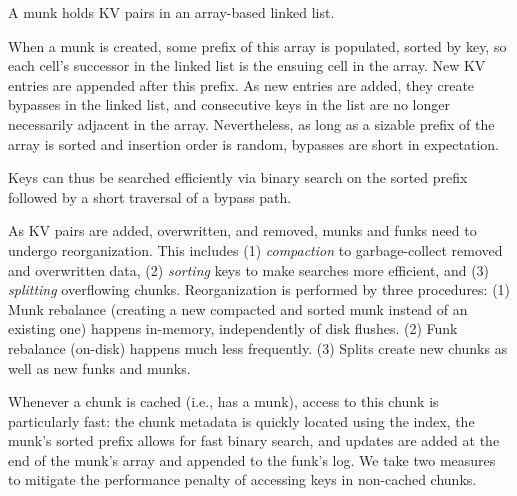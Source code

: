 \documentclass[sigplan,10pt]{acmart}
\newcommand{\code}[1]{\textsf{\fontsize{9}{11}\selectfont #1}}
\newcommand{\remove}[1]{}
\newcommand{\sys}{EvenDB}
\begin{document}

A munk holds KV pairs in an array-based linked list.  
\remove{
A munk consists of two arrays -- \emph{karray} for keys and \emph{varray} for values. The  \code{karray}  holds a sorted linked list of the chunk's keys
with pointers to values in the \code{varray}. 
}
When a munk is created, some prefix of this array is populated,
sorted by key, so each cell's successor in the linked list is the ensuing cell in the array.
New KV entries are appended after this prefix.
As new entries are added, they create bypasses in the linked list, and consecutive keys in the
list are no longer necessarily adjacent in the array. Nevertheless, as long as 
a sizable prefix of the  array  is sorted and insertion order is random, bypasses are short in expectation.
\remove{Key removals, in turn, leave obsolete values in the munk, so it is no longer compacted.}
Keys can thus be searched efficiently via binary search on the sorted prefix followed by a short traversal 
of a bypass path. %

As KV pairs are added, overwritten, and removed, munks and funks need to undergo reorganization. This includes  
(1) \emph{compaction} to garbage-collect removed and overwritten data, 
(2) \emph{sorting} keys to make searches more efficient,  and
(3) \emph{splitting} overflowing chunks.
Reorganization is performed by three procedures: 
(1) Munk rebalance (creating a new compacted and sorted munk instead of an existing one) 
happens in-memory, independently of disk flushes. 
(2) Funk rebalance (on-disk) happens much less frequently. 
(3) Splits  create new chunks as well as new  funks and munks.


Whenever a chunk is cached (i.e., has a munk), access to this chunk is particularly fast:
the chunk metadata is quickly located using the index, the munk's sorted prefix allows for fast 
binary search, and updates are added at the end of the munk's array and appended to the funk's log.
We take two measures to mitigate the performance penalty of accessing keys in non-cached chunks.
\end{document}
